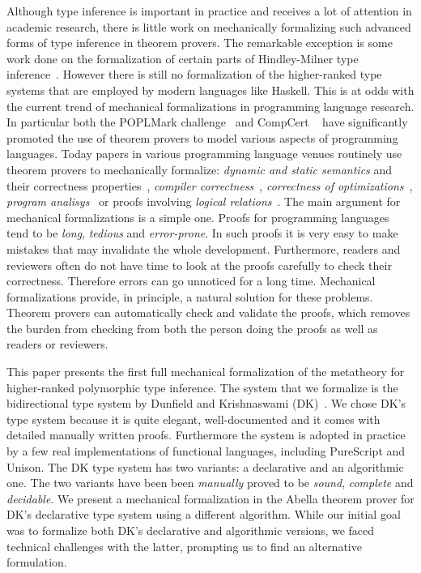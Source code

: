Although type inference is important in practice and receives a lot of
attention in
academic research, there is little work on mechanically formalizing
such advanced forms of type inference in theorem provers.
The remarkable exception is some work done on the formalization of 
certain parts of Hindley-Milner type inference~\cite{naraschewski1999type,
dubois2000proving,dubois1999certification,urban2008nominal,
garrigue2015certified}. However
there is still no formalization of the higher-ranked type systems
that are employed by modern languages like Haskell.
This is at
odds with the current trend of mechanical formalizations in
programming language research. In particular both the POPLMark
challenge~\cite{aydemir2005mechanized} and
CompCert ~\cite{leroy2012compcert} have significantly promoted
the use of theorem provers to model various aspects of programming
languages. Today papers in various programming language venues routinely
use theorem provers to mechanically formalize: \emph{dynamic and
  static semantics} and their correctness properties~\cite{aydemir2008engineering},
\emph{compiler correctness}~\cite{leroy2012compcert}, \emph{correctness of
  optimizations}~\cite{Bertot04}, \emph{program analisys}~\cite{Chang2006}
or proofs involving \emph{logical relations}~\cite{abel2018}. The
main argument for mechanical formalizations is a simple one. Proofs
for programming languages tend to be \emph{long}, \emph{tedious} and
\emph{error-prone}. In such proofs it is very easy to make mistakes
that may invalidate the whole development. Furthermore, readers and
reviewers often do not have time to look at the proofs carefully to
check their correctness. Therefore errors can go unnoticed for a
long time.  Mechanical formalizations provide, in principle, a natural
solution for these problems. Theorem provers can automatically check and
validate the proofs, which removes the burden from checking from both
the person doing the proofs as well as readers or reviewers.

This paper presents the first full mechanical formalization of the
metatheory for higher-ranked polymorphic type inference.
The system
that we formalize is the bidirectional type system by Dunfield and
Krishnaswami (DK)~\cite{dunfield2013complete}.
We chose DK's type system because it is
quite elegant, well-documented and it comes with detailed manually
written proofs. Furthermore the system is adopted in practice by a few
real implementations of functional languages, including PureScript and
Unison. The DK type system has two variants: a declarative
and an algorithmic one. The two variants have been been
\emph{manually} proved to be \emph{sound}, \emph{complete} and
\emph{decidable}.
We present a mechanical formalization in the Abella theorem prover for
DK's declarative type system using a different algorithm. While our
initial goal was to formalize both DK's declarative and algorithmic
versions, we faced technical challenges with the latter, prompting us to find
an alternative formulation.

